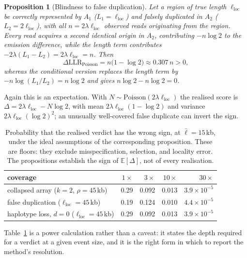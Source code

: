 \documentclass[11pt]{article}
\newtheorem{proposition}{Proposition}
\begin{document}
\begin{proposition}[Blindness to false duplication]
\label{prop:dup}
Let a region of true length $\ell_{\mathrm{loc}}$ be correctly represented by
$A_1$ ($L_1 = \ell_{\mathrm{loc}}$) and falsely duplicated in $A_2$
($L_2 = 2\ell_{\mathrm{loc}}$), with all $n = 2\lambda\ell_{\mathrm{loc}}$
observed reads originating from the region.  Every read acquires a second
identical origin in $A_2$, contributing $-n\log 2$ to the emission difference,
while the length term contributes
$-2\lambda(L_1-L_2) = 2\lambda\ell_{\mathrm{loc}} = n$.  Then
\begin{equation}
    \Delta\mathrm{LLR}_{\text{Poisson}} = n\big(1-\log 2\big) \approx 0.307\,n > 0,
\end{equation}
whereas the conditional version replaces the length term by
$-n\log(L_1/L_2) = n\log 2$ and gives $n\log 2 - n\log 2 = 0$.
\end{proposition}

Again this is an expectation.  With $N \sim \text{Poisson}(2\lambda
\ell_{\mathrm{loc}})$ the realised score is
$\Delta = 2\lambda\ell_{\mathrm{loc}} - N\log 2$, with mean
$2\lambda\ell_{\mathrm{loc}}(1-\log 2)$ and variance
$2\lambda\ell_{\mathrm{loc}}(\log 2)^2$; an unusually well-covered false
duplicate can invert the sign.

\begin{table}[t]
\centering
\small
\begin{tabular}{lrrrr}
\toprule
coverage & $1\times$ & $3\times$ & $10\times$ & $30\times$ \\
\midrule
collapsed array ($k=2$, $\rho=45$\,kb) & 0.29 & 0.092 & 0.013 & $3.9\times10^{-5}$ \\
false duplication ($\ell_{\mathrm{loc}}=45$\,kb) & 0.19 & 0.124 & 0.010 & $4.4\times10^{-5}$ \\
haplotype loss, $d=0$ ($\ell_{\mathrm{loc}}=45$\,kb) & 0.29 & 0.092 & 0.013 & $3.9\times10^{-5}$ \\
\bottomrule
\end{tabular}
\caption{Probability that the realised verdict has the wrong sign, at
$\bar\ell=15$\,kb, under the ideal assumptions of the corresponding
proposition.  These are floors: they exclude misspecification, selection, and
locality error.  The propositions establish the sign of
$\mathbb{E}[\Delta]$, not of every realisation.}
\label{tab:power}
\end{table}

Table~\ref{tab:power} is a power calculation rather than a caveat: it states
the depth required for a verdict at a given event size, and it is the right
form in which to report the method's resolution.
\end{document}
